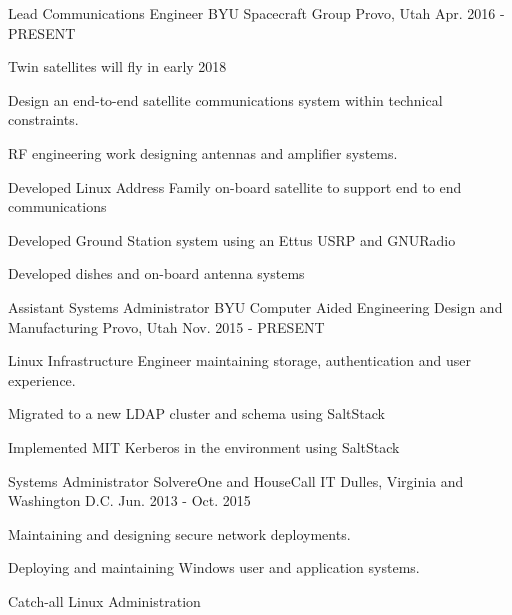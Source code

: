 

\begin{cventries}

    \cventry
    {Lead Communications Engineer} %
    {BYU Spacecraft Group} %
    {Provo, Utah} %
    {Apr. 2016 - PRESENT} %
    {
        \begin{cvitems} %
        \item {Twin satellites will fly in early 2018}
        \item {Design an end-to-end satellite communications system within technical constraints.}
        \item {RF engineering work designing antennas and amplifier systems.}
        \item {Developed Linux Address Family on-board satellite to support end to end communications}
        \item {Developed Ground Station system using an Ettus USRP and GNURadio}
        \item {Developed dishes and on-board antenna systems}
        \end{cvitems}
    }

    \cventry
    {Assistant Systems Administrator} %
    {BYU Computer Aided Engineering Design and Manufacturing} %
    {Provo, Utah} %
    {Nov. 2015 - PRESENT} %
    {
        \begin{cvitems} %
        \item {Linux Infrastructure Engineer maintaining storage, authentication and user experience.}
        \item {Migrated to a new LDAP cluster and schema using SaltStack}
        \item {Implemented MIT Kerberos in the environment using SaltStack}
        \end{cvitems}
    }

    \cventry
    {Systems Administrator} %
    {SolvereOne and HouseCall IT} %
    {Dulles, Virginia and Washington D.C.} %
    {Jun. 2013 - Oct. 2015} %
    {
        \begin{cvitems} %
        \item {Maintaining and designing secure network deployments.}
        \item {Deploying and maintaining Windows user and application systems.}
        \item {Catch-all Linux Administration}
        \end{cvitems}
    }

\end{cventries}

